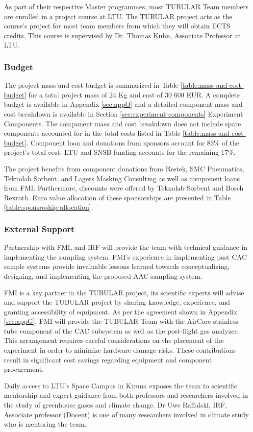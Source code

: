 As part of their respective Master programmes, most TUBULAR Team members are enrolled in a project course at LTU. The TUBULAR project acts as the course's project for most team members from which they will obtain ECTS credits. This course is supervised by Dr. Thomas Kuhn, Associate Professor at LTU.

\pagebreak
\subsubsection{Budget}
\label{sec:3.2.2}
The project mass and cost budget is summarized in Table \ref{table:mass-and-cost-budget} for a total project mass of 24 Kg and cost of 30 600 EUR. A complete budget is available in Appendix \ref{sec:appO} and a detailed component mass and cost breakdown is available in Section \ref{sec:experiment-components} Experiment Components. The component mass and cost breakdown does not include spare components accounted for in the total costs listed in Table \ref{table:mass-and-cost-budget}. Component loan and donations from sponsors account for 83\% of the project's total cost. LTU and SNSB funding accounts for the remaining 17\%. 



The project benefits from component donations from Restek, SMC Pneumatics, Teknolab Sorbent, and Lagers Masking Consulting as well as component loans from FMI. Furthermore, discounts were offered by Teknolab Sorbent and Bosch Rexroth. Euro value allocation of these sponsorships are presented in Table \ref{table:sponsroship-allocation}.




\subsubsection{External Support}

Partnership with FMI, and IRF will provide the team with technical guidance in implementing the sampling system. FMI’s experience in implementing past CAC sample systems provide invaluable lessons learned towards conceptualizing, designing, and implementing the proposed AAC sampling system.

FMI is a key partner in the TUBULAR project, its scientific experts will advise and support the TUBULAR project by sharing knowledge, experience, and granting accessibility of equipment. As per the agreement shown in Appendix \ref{sec:appG}, FMI will provide the TUBULAR Team with the AirCore stainless tube component of the CAC subsystem as well as the post-flight gas analyzer. This arrangement requires careful considerations on the placement of the experiment in order to minimize hardware damage risks. These contributions result in significant cost savings regarding equipment and component procurement.

Daily access to LTU's Space Campus in Kiruna exposes the team to scientific mentorship and expert guidance from both professors and researchers involved in the study of greenhouse gases and climate change. Dr Uwe Raffalski, IRF, Associate professor (Docent) is one of many researchers involved in climate study who is mentoring the team.